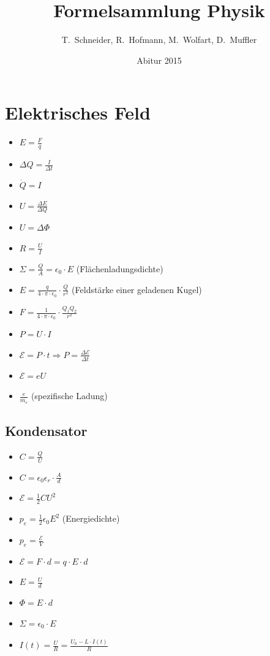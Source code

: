 \documentclass[paper = a4, twocolumn]{scrartcl}
\title{Formelsammlung Physik}
\author{T.~Schneider, R.~Hofmann, M.~Wolfart, D.~Muffler}
\date{Abitur 2015}
\DeclareRobustCommand{\E}{\mathcal{E}}
\begin{document}
\maketitle
\tableofcontents

\section{Elektrisches Feld}
\begin{itemize}
\item
	\( E = \frac{F}{q} \)
\item
	\( \Delta Q = \frac{I}{\Delta t} \)
\item
	\( \dot{Q} = I \)
\item
	\( U = \frac{\Delta E}{\Delta Q} \)
\item
	\( U = \Delta \Phi \)
\item
	\( R = \frac{U}{I} \)
\item
	\( \Sigma = \frac{Q}{A} = \epsilon_0 \cdot E \) (Flächenladungsdichte)
\item
	\( E = \frac{q}{4 \cdot \pi \cdot \epsilon_0} \cdot \frac{Q}{r^2} \)
	(Feldstärke einer geladenen Kugel)
\item
	\( F = \frac{1}{4 \cdot \pi \cdot \epsilon_0} \cdot \frac{Q_1 Q_2}{r^2} \)
\item
	\( P = U \cdot I \)
\item
	\( \E = P \cdot t \Rightarrow P = \frac{\Delta \E}{\Delta t} \)
\item
	\( \E = eU \)
\item
	\( \frac{e}{m_e} \) (spezifische Ladung)
\end{itemize}

\subsection{Kondensator}
\begin{itemize}
\item
	\( C = \frac{Q}{U} \)
\item
	\( C = \epsilon_0 \epsilon_r \cdot \frac{A}{d} \)
\item
	\( \E = \frac{1}{2} C U^2 \)
\item
	\( p_e = \frac{1}{2} \epsilon_0 E^2 \) (Energiedichte)
\item
	\( p_e = \frac{\E}{V} \)
\item
	\( \E = F \cdot d = q \cdot E \cdot d \)
\item
	\( E = \frac{U}{d} \)
\item
	\( \Phi = E \cdot d \)
\item
	\( \Sigma = \epsilon_0 \cdot E \)
\item
	\( I(t) = \frac{U}{R} = \frac{U_0 - L \cdot \dot{I}(t)}{R} \)
\end{itemize}
\end{document}
